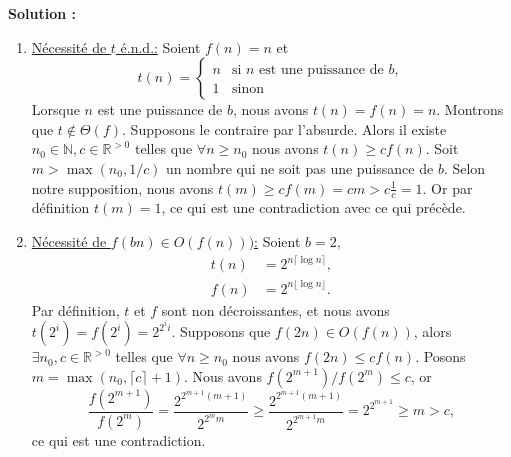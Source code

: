 \documentclass[11pt]{article} %
\newenvironment{solution}[1][\unskip]{%
	\par
	\noindent
	\textbf{Solution #1:}
	\noindent}
{\medskip}
\begin{document}
	
	\begin{solution}
		\begin{enumerate}
			\item {\underline{Nécessité de $t$ é.n.d.:} Soient $f(n)=n$ et
				\begin{equation*}
					t(n)=\left\{
					\begin{array}{ll}
						n & \text{si } n \text{ est une puissance de }b,\\
						1 & \text{sinon }
					\end{array} \right.
				\end{equation*}	
				Lorsque $n$ est une puissance de $b$, nous avons $t(n)=f(n)=n$. Montrons que $t \notin \Theta(f)$. Supposons le contraire par l'absurde. Alors il existe $n_0\in \mathbb{N}, c \in \mathbb{R}^{>0}$ telles que $\forall n \geq n_0$ nous avons $t(n) \geq cf(n)$. Soit $m > \max(n_0, 1/c)$ un nombre qui ne soit pas une puissance de $b$. Selon notre supposition, nous avons $t(m) \geq cf(m)=cm > c\frac{1}{c}=1$. Or par définition $t(m)=1$, ce qui est une contradiction avec ce qui précède.}
			\item{\underline{Nécessité de $f(bn) \in O(f(n)))$:} Soient $b=2$,
				\begin{align*}
					t(n)&=2^{n\lceil\log n\rceil},\\
					f(n)&=2^{n\lfloor\log n\rfloor}.
				\end{align*}
				Par définition, $t$ et $f$ sont non décroissantes, et nous avons $t(2^i)=f(2^i)=2^{2^i i}$. Supposons que $f(2n)\in O(f(n))$, alors $\exists n_0, c\in \mathbb{R}^{>0}$ telles que $\forall n \geq n_0$ nous avons $f(2n)\leq cf(n)$. Posons $m=\max(n_0, \lceil c \rceil+1)$. Nous avons $f(2^{m+1})/f(2^m)\leq c$, or
				$$\frac{f(2^{m+1})}{f(2^m)}=\frac{2^{2^{m+1}(m+1)}}{2^{2^m m}}\geq \frac{2^{2^{m+1}(m+1)}}{2^{2^{m+1} m}}=2^{2^{m+1}}\geq m > c,$$
				ce qui est une contradiction.
				
}
\end{enumerate}
\end{solution}
\end{document}
